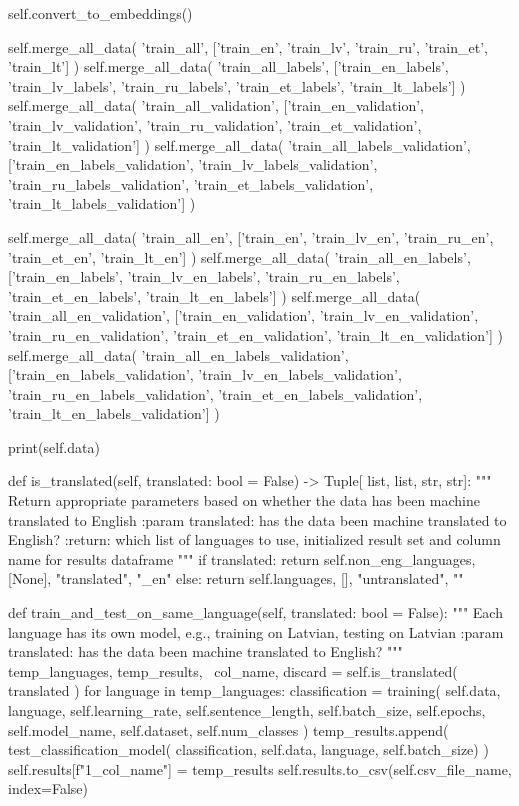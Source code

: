 \begin{python}
    self.convert_to_embeddings()

    self.merge_all_data(
      'train_all',
      ['train_en', 'train_lv', 'train_ru', 'train_et',
       'train_lt']
    )
    self.merge_all_data(
      'train_all_labels',
      ['train_en_labels', 'train_lv_labels',
       'train_ru_labels', 'train_et_labels',
       'train_lt_labels']
    )
    self.merge_all_data(
      'train_all_validation',
      ['train_en_validation', 'train_lv_validation',
       'train_ru_validation', 'train_et_validation',
       'train_lt_validation']
    )
    self.merge_all_data(
      'train_all_labels_validation',
      ['train_en_labels_validation',
       'train_lv_labels_validation',
       'train_ru_labels_validation',
       'train_et_labels_validation',
       'train_lt_labels_validation']
    )

    self.merge_all_data(
      'train_all_en',
      ['train_en', 'train_lv_en', 'train_ru_en',
       'train_et_en', 'train_lt_en']
    )
    self.merge_all_data(
      'train_all_en_labels',
      ['train_en_labels', 'train_lv_en_labels',
       'train_ru_en_labels', 'train_et_en_labels',
       'train_lt_en_labels']
    )
    self.merge_all_data(
      'train_all_en_validation',
      ['train_en_validation', 'train_lv_en_validation',
       'train_ru_en_validation',
       'train_et_en_validation',
       'train_lt_en_validation']
    )
    self.merge_all_data(
      'train_all_en_labels_validation',
      ['train_en_labels_validation',
       'train_lv_en_labels_validation',
       'train_ru_en_labels_validation',
       'train_et_en_labels_validation',
       'train_lt_en_labels_validation']
    )

    print(self.data)

  def is_translated(self, translated: bool = False) -> Tuple[
    list, list, str, str]:
    """ Return appropriate parameters based on
    whether the data has been machine translated to English
    :param translated: has the data been machine translated to English?
    :return: which list of languages to use,
    initialized result set and column name for results dataframe
    """
    if translated:
      return self.non_eng_languages, [None], "translated", "_en"
    else:
      return self.languages, [], "untranslated", ""

  def train_and_test_on_same_language(self, translated: bool = False):
    """ Each language has its own model,
    e.g., training on Latvian, testing on Latvian
    :param translated: has the data been machine translated to English?
    """
    temp_languages, temp_results, \
      col_name, discard = self.is_translated(
      translated
    )
    for language in temp_languages:
      classification = training(
        self.data, language, self.learning_rate,
        self.sentence_length, self.batch_size,
        self.epochs, self.model_name, self.dataset,
        self.num_classes
      )
      temp_results.append(
        test_classification_model(
          classification, self.data, language,
          self.batch_size)
      )
    self.results[f"1_{col_name}"] = temp_results
    self.results.to_csv(self.csv_file_name, index=False)


\end{python}
